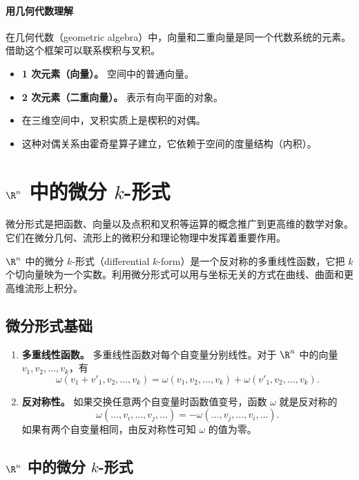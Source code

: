 \paragraph{用几何代数理解}
在几何代数（geometric algebra）中，向量和二重向量是同一个代数系统的元素。借助这个框架可以联系楔积与叉积。
\begin{itemize}
\item \textbf{1 次元素（向量）。} 空间中的普通向量。
\item \textbf{2 次元素（二重向量）。} 表示有向平面的对象。
\end{itemize}

\begin{itemize}
\item 在三维空间中，叉积实质上是楔积的对偶。
\item 这种对偶关系由霍奇星算子建立，它依赖于空间的度量结构（内积）。
\end{itemize}

\section{\texorpdfstring{$\R^n$}{Rⁿ} 中的微分 \texorpdfstring{$k$}{k}-形式}
\label{sec:3.5}
微分形式是把函数、向量以及点积和叉积等运算的概念推广到更高维的数学对象。它们在微分几何、流形上的微积分和理论物理中发挥着重要作用。

$\R^n$ 中的微分 $k$-形式（differential $k$-form）是一个反对称的多重线性函数，它把 $k$ 个切向量映为一个实数。利用微分形式可以用与坐标无关的方式在曲线、曲面和更高维流形上积分。

\subsection{微分形式基础}
\begin{enumerate}[label=\alph*.]
\item \textbf{多重线性函数。} 多重线性函数对每个自变量分别线性。对于 $\R^n$ 中的向量 $v_1,v_2,\dots,v_k$，有
\[
  \omega(v_1+v'_1,v_2,\dots,v_k)
  =\omega(v_1,v_2,\dots,v_k)+\omega(v'_1,v_2,\dots,v_k).
\]
\item \textbf{反对称性。} 如果交换任意两个自变量时函数值变号，函数 $\omega$ 就是反对称的
\[
  \omega(\dots,v_i,\dots,v_j,\dots)=-\omega(\dots,v_j,\dots,v_i,\dots).
\]
如果有两个自变量相同，由反对称性可知 $\omega$ 的值为零。
\end{enumerate}

\subsection{\texorpdfstring{$\R^n$}{Rⁿ} 中的微分 \texorpdfstring{$k$}{k}-形式}

